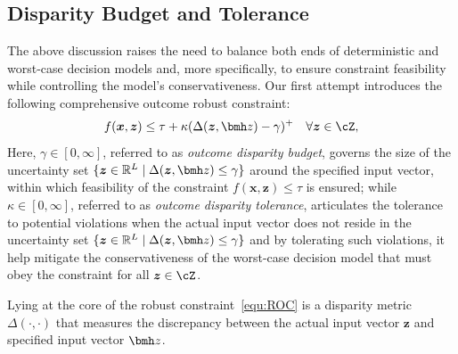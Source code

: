 \documentclass[mnsc, nonblindrev]{informswp}
\newcommand{\1}[1]{\mathds{1}{\left(#1\right)}}
\begin{document}
\subsection*{Disparity Budget and Tolerance}

The above discussion raises the need to balance both ends of deterministic and worst-case decision models and, more specifically, to ensure constraint feasibility while controlling the model's conservativeness. Our first attempt introduces the following comprehensive outcome robust constraint:
\begin{equation}
\label{equ:ROC}
f(\bm x,\bm z) \leq \tau + \kappa (\Delta(\bm z,\bmh z) - \gamma)^+ ~~~\forall \bm z \in \cZ,
\end{equation}
Here, $\gamma \in [0,\infty]$, referred to as \textit{outcome disparity budget}, governs the size of the uncertainty set $\{\bm z \in \mathbb{R}^L \;|\; \Delta(\bm z, \bmh z) \leq \gamma\}$ around the specified input vector, within which feasibility of the constraint $f(\bm x, \bm z) \leq \tau$ is ensured; while $\kappa \in [0, \infty]$, referred to as \textit{outcome disparity tolerance}, articulates the tolerance to potential violations when the actual input vector does not reside in the uncertainty set $\{\bm z \in \mathbb{R}^L \;|\; \Delta(\bm z, \bmh z) \leq \gamma\}$ and by tolerating such violations, it help mitigate the conservativeness of the worst-case decision model that must obey the constraint for all $\bm z \in \cZ$. 

Lying at the core of the robust constraint~\eqref{equ:ROC} is a disparity metric $\Delta(\cdot,\cdot)$ that measures the discrepancy between the actual input vector $\bm z$ and specified input vector $\bmh z$. 
\end{document}

